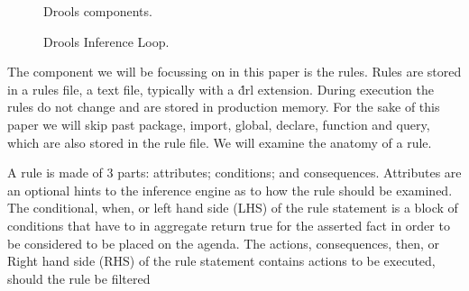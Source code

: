 \begin{figure}[h]
    \centering
    \caption{Drools components.}
    \label{fig:Drools_components}
\end{figure}

\begin{figure}[h]
    \centering
    \caption{Drools Inference Loop.}
    \label{fig:Drools_inference_loop}
\end{figure}


The component we will be focussing on in this paper is the rules.
Rules are stored in a rules file, a text file, typically with a \.drl extension.  
During execution the rules do not change and are stored in production memory.
For the sake of this paper we will skip past package, import, global, declare, function and query, which are also stored in the rule file.
We will examine the anatomy of a rule.

A rule is made of 3 parts: attributes; conditions; and consequences.
Attributes are an optional hints to the inference engine as to how the rule should be examined.
The conditional, when, or left hand side (LHS) of the rule statement is a block of conditions that have to in aggregate return true for the asserted fact in order to be considered to be placed on the agenda.
The actions, consequences, then, or Right hand side (RHS) of the rule statement contains actions to be executed, should the rule be filtered

